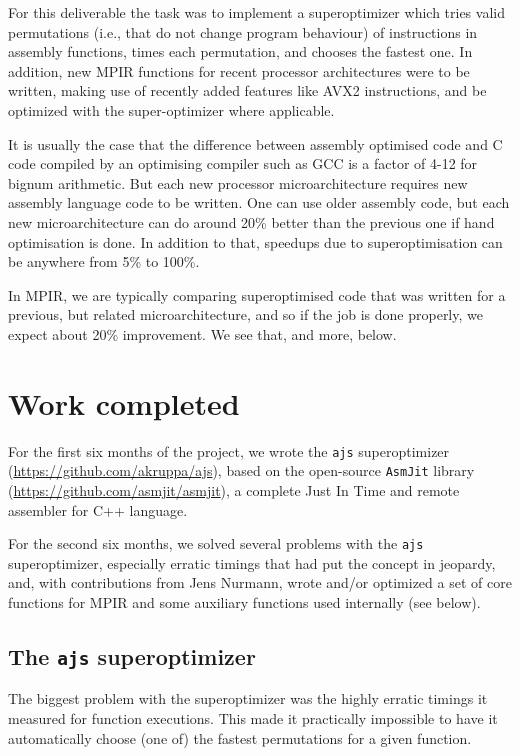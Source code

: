 For this deliverable the task was to implement a superoptimizer which
tries valid permutations (i.e., that do not change program behaviour) of
instructions in assembly functions, times each permutation, and chooses
the fastest one. In addition, new MPIR functions for recent processor
architectures were to be written, making use of recently added features
like AVX2 instructions, and be optimized with the super-optimizer where
applicable.

It is usually the case that the difference between assembly optimised
code and C code compiled by an optimising compiler such as GCC is a
factor of 4-12 for bignum arithmetic. But each new processor
microarchitecture requires new assembly language code to be written. One
can use older assembly code, but each new microarchitecture can do
around 20\% better than the previous one if hand optimisation is done.
In addition to that, speedups due to superoptimisation can be anywhere
from 5\% to 100\%.

In MPIR, we are typically comparing superoptimised code that was written
for a previous, but related microarchitecture, and so if the job is done
properly, we expect about 20\% improvement. We see that, and more,
below.

\section*{Work completed}\label{work-completed}

For the first six months of the project, we wrote the \texttt{ajs}
superoptimizer (\url{https://github.com/akruppa/ajs}), based on the
open-source \texttt{AsmJit} library
(\url{https://github.com/asmjit/asmjit}), a complete Just In Time and
remote assembler for C++ language.

For the second six months, we solved several problems with the
\texttt{ajs} superoptimizer, especially erratic timings that had put the
concept in jeopardy, and, with contributions from Jens Nurmann, wrote
and/or optimized a set of core functions for MPIR and some auxiliary
functions used internally (see below).

\subsection{\texorpdfstring{The \texttt{ajs}
superoptimizer}{The ajs superoptimizer}}\label{the-ajs-superoptimizer}

The biggest problem with the superoptimizer was the highly erratic
timings it measured for function executions. This made it practically
impossible to have it automatically choose (one of) the fastest
permutations for a given function.

